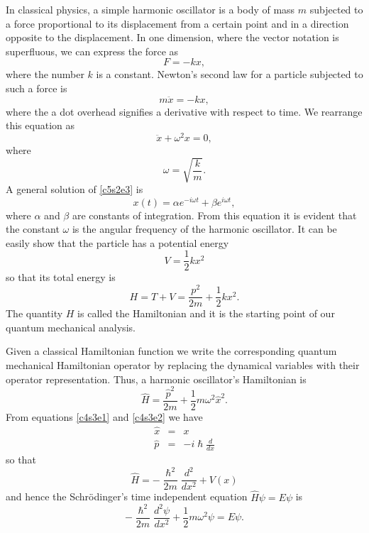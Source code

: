In classical physics, a simple harmonic oscillator is a body of mass $m$ 
subjected to a force proportional to its displacement from a certain point and
in a direction opposite to the displacement. In one dimension, where the
vector notation is superfluous, we can express the force as
\begin{equation}\label{c5s2e1}
F = -kx,
\end{equation}
where the number $k$ is a constant. Newton's second law for a particle subjected
to such a force is
\begin{equation}\label{c5s2e2}
m\ddot{x} = -kx,
\end{equation}
where the a dot overhead signifies a derivative with respect to time. We 
rearrange this equation as
\begin{equation}\label{c5s2e3}
\ddot{x} + \omega^2 x = 0,
\end{equation}
where
\begin{equation}\label{c5s2e4}
\omega = \sqrt{\frac{k}{m}}.
\end{equation}
A general solution of \eqref{c5s2e3} is
\begin{equation}\label{c5s2e5}
x(t) = \alpha e^{-i\omega t} + \beta e^{i\omega t},
\end{equation}
where $\alpha$ and $\beta$ are constants of integration. From this equation it
is evident that the constant $\omega$ is the angular frequency of the harmonic
oscillator. It can be easily show that the particle has a potential energy
\begin{equation}\label{c5s2e6}
V = \frac{1}{2}kx^2
\end{equation}
so that its total energy is
\begin{equation}\label{c5s2e7}
H = T + V = \frac{p^2}{2m} + \frac{1}{2}kx^2.
\end{equation}
The quantity $H$ is called the Hamiltonian and it is the starting point of 
our quantum mechanical analysis.

Given a classical Hamiltonian function we write the corresponding quantum
mechanical Hamiltonian operator by replacing the dynamical variables with their
operator representation. Thus, a harmonic oscillator's Hamiltonian is
\begin{equation}\label{c5s2e8}
\hat{H} = \frac{\hat{p}^2}{2m} + \frac{1}{2}m\omega^2\hat{x}^2.
\end{equation}
From equations \eqref{c4s3e1} and \eqref{c4s3e2} we have
\begin{eqnarray}
\hat{x} &=& x \label{c5s2e9} \\
\hat{p} &=& -i\hslash\frac{d}{dx} \label{c5s2e10}
\end{eqnarray}
so that
\begin{equation}\label{c5s2e11}
\hat{H} = -\frac{\hslash^2}{2m}\frac{d^2}{dx^2} + V(x)
\end{equation}
and hence the Schr\"{o}dinger's time independent equation $\hat{H}\psi = E\psi$
is
\begin{equation}\label{c5e2e12}
-\frac{\hslash^2}{2m}\frac{d^2\psi}{dx^2} + \frac{1}{2}m\omega^2\psi = E\psi.
\end{equation}

